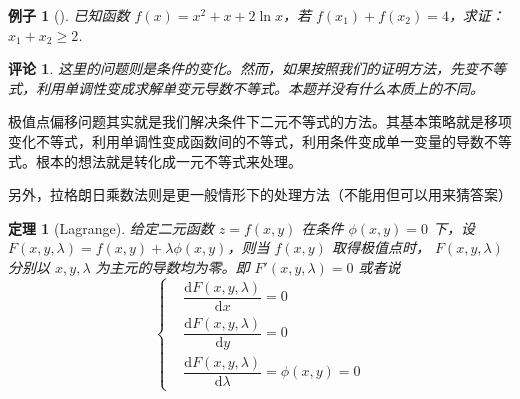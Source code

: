 \documentclass[a4paper,10pt]{article}
\newtheorem{theorem}{定理}[section]
\newtheorem{example}{例子}
\newtheorem{remark}{评论}
\begin{document}
\begin{example}[\cite{ZSJC202103016}]
    已知函数 $ f(x)=x^2+x+2\ln x  $，若 $ f(x_1)+f(x_2)=4  $，求证： $ x_1+x_2 \geq 2 $. 
\end{example}
\begin{remark}
    这里的问题则是条件的变化。然而，如果按照我们的证明方法，先变不等式，利用单调性变成求解单变元导数不等式。本题并没有什么本质上的不同。
\end{remark}
极值点偏移问题其实就是我们解决条件下二元不等式的方法。其基本策略就是移项变化不等式，利用单调性变成函数间的不等式，利用条件变成单一变量的导数不等式。根本的想法就是转化成一元不等式来处理。

另外，拉格朗日乘数法则是更一般情形下的处理方法（不能用但可以用来猜答案）\cite{FZSX202307015}
\begin{theorem}[Lagrange]
    给定二元函数 $ z=f(x,y)  $ 在条件 $ \phi(x,y)=0 $ 下，设 $ F(x,y,\lambda)=f(x,y)+\lambda\phi(x,y)$，则当 $ f(x,y) $ 取得极值点时， $ F(x,y,\lambda) $ 分别以 $ x,y,\lambda  $ 为主元的导数均为零。即 $ F'(x,y,\lambda)=0 $ 或者说
    \begin{equation}
        \left\{
            \begin{aligned}
                {}&\dfrac{\mathrm{d}F(x,y,\lambda)}{\mathrm{d}x}=0\\
                {}&\dfrac{\mathrm{d}F(x,y,\lambda)}{\mathrm{d}y}=0\\
                {}&\dfrac{\mathrm{d}F(x,y,\lambda)}{\mathrm{d}\lambda}=\phi(x,y)=0
            \end{aligned}
        \right.
    \end{equation}   
\end{theorem}

\end{document}
